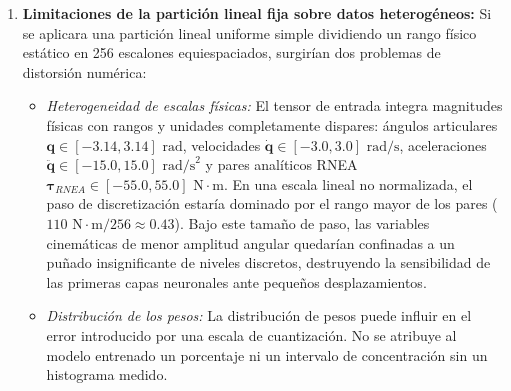 \documentclass[12pt]{article}
\begin{document}
\begin{enumerate}
    \item \textbf{Limitaciones de la partición lineal fija sobre datos heterogéneos:}
    Si se aplicara una partición lineal uniforme simple dividiendo un rango físico estático en 256 escalones equiespaciados, surgirían dos problemas de distorsión numérica:
    \begin{itemize}
        \item \textit{Heterogeneidad de escalas físicas:} El tensor de entrada integra magnitudes físicas con rangos y unidades completamente dispares: ángulos articulares $\bm{q} \in [-3.14, 3.14]\text{ rad}$, velocidades $\dot{\bm{q}} \in [-3.0, 3.0]\text{ rad/s}$, aceleraciones $\ddot{\bm{q}} \in [-15.0, 15.0]\text{ rad/s}^2$ y pares analíticos RNEA $\bm{\tau}_{RNEA} \in [-55.0, 55.0]\text{ N}\cdot\text{m}$. En una escala lineal no normalizada, el paso de discretización estaría dominado por el rango mayor de los pares ($110\text{ N}\cdot\text{m} / 256 \approx 0.43$). Bajo este tamaño de paso, las variables cinemáticas de menor amplitud angular quedarían confinadas a un puñado insignificante de niveles discretos, destruyendo la sensibilidad de las primeras capas neuronales ante pequeños desplazamientos.
        \item \textit{Distribución de los pesos:} La distribución de pesos puede influir en el error introducido por una escala de cuantización. No se atribuye al modelo entrenado un porcentaje ni un intervalo de concentración sin un histograma medido.
    \end{itemize}


\end{enumerate}
\end{document}
